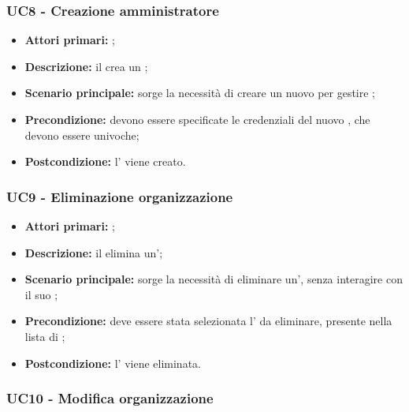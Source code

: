 \documentclass[casi-duso]{subfiles}
\begin{document}
\subsubsection{UC8 - Creazione amministratore}
\label{subsub:UC8}

\begin{itemize}
  \item \textbf{Attori primari:} ;
  \item \textbf{Descrizione:} il  crea un  ;
  \item \textbf{Scenario principale:} sorge la necessità di creare un nuovo  per gestire ;
  \item \textbf{Precondizione:} devono essere specificate le credenziali del nuovo , che devono essere univoche;
  \item \textbf{Postcondizione:} l' viene creato.

\end{itemize}

\subsubsection{UC9 - Eliminazione organizzazione}
\label{subsub:UC9}

\begin{itemize}
  \item \textbf{Attori primari:} ;
  \item \textbf{Descrizione:} il  elimina un';
  \item \textbf{Scenario principale:} sorge la necessità di eliminare un', senza interagire con il suo ;
  \item \textbf{Precondizione:} deve essere stata selezionata l' da eliminare, presente nella lista di ;
  \item \textbf{Postcondizione:} l' viene eliminata.

\end{itemize}


\subsubsection{UC10 - Modifica organizzazione}
\label{subsub:UC10}
\end{document}
